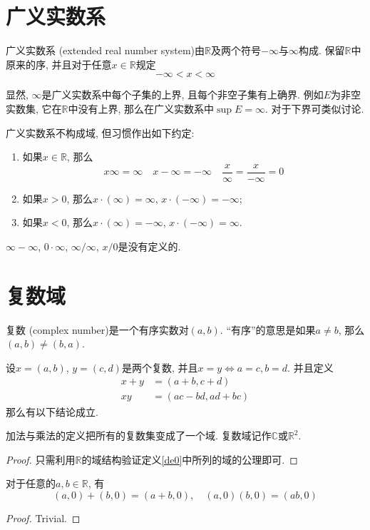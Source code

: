 \documentclass[cn,12pt,math=mtpro2,citestyle=gb7714-2015,bibstyle=gb7714-2015,twocol]{elegantbook}
\newcommand{\R}{\mathbb{R}}
\newcommand{\C}{\mathbb{C}}
\begin{document}
\section{广义实数系}
\begin{definition}\label{de3}
广义实数系 (extended real number system)由$\R$及两个符号$-\infty$与$\infty$构成. 保留$\R$中原来的序, 并且对于任意$ x \in \R$规定
$$-\infty<x<\infty$$
\end{definition}
显然, $\infty$是广义实数系中每个子集的上界, 且每个非空子集有上确界. 例如$E$为非空实数集, 它在$\R$中没有上界, 那么在广义实数系中$\sup E=\infty$. 对于下界可类似讨论.

广义实数系不构成域, 但习惯作出如下约定:
\begin{enumerate}[label=(\arabic*)]
\item 如果$x \in \R$, 那么
$$x\infty=\infty\quad x-\infty=-\infty\quad \frac{x}{\infty}=\frac{x}{-\infty}=0$$
\item 如果$x>0$, 那么$x\cdot(\infty)=\infty$, $x\cdot(-\infty)=-\infty$;
\item 如果$x<0$, 那么$x\cdot(\infty)=-\infty$, $x\cdot(-\infty)=\infty$.
\end{enumerate}
\begin{remark}
$\infty-\infty$, $0\cdot\infty$, $\infty/\infty$, $x/0$是没有定义的.
\end{remark}
\section{复数域}
\begin{definition}
复数 (complex number)是一个有序实数对$(a,b)$. “有序”的意思是如果$a\neq b$, 那么$(a,b)\neq (b,a)$.
\end{definition}
设$x=(a,b)$, $y=(c,d)$是两个复数, 并且$x=y\Leftrightarrow a=c, b=d$. 并且定义
\begin{align*}
x+y&=(a+b,c+d) \\
xy&=(ac-bd,ad+bc)
\end{align*}
那么有以下结论成立.
\begin{theorem}
  加法与乘法的定义把所有的复数集变成了一个域. 复数域记作$\C$或$\R^2$.
\end{theorem}
\begin{proof}
只需利用$\R$的域结构验证定义\ref{de0}中所列的域的公理即可.
\end{proof}
\begin{theorem}\label{th1}
  对于任意的$ a, b \in \R$, 有
  $$(a,0)+(b,0)=(a+b,0),\quad (a,0)(b,0)=(ab,0)$$
\end{theorem}
\begin{proof}
  Trivial.
\end{proof}
\end{document}
